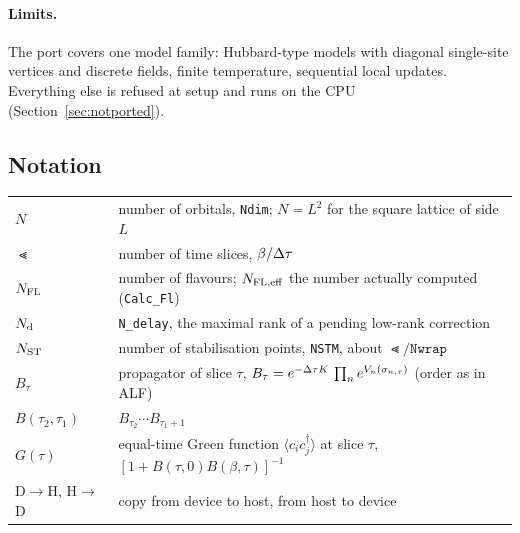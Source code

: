 \paragraph{Limits.} The port covers one model family: Hubbard-type models with diagonal single-site vertices and discrete fields, finite temperature, sequential local updates. Everything else is refused at setup and runs on the CPU (Section~\ref{sec:notported}).



\subsection{Notation}

\begin{tabular}{@{}lp{11.5cm}@{}}
$N$ & number of orbitals, \texttt{Ndim}; $N=L^2$ for the square lattice of side $L$\\
$\Lt$ & number of time slices, $\beta/\Delta\tau$\\
$N_{\rm FL}$ & number of flavours; $N_{\rm FL,eff}$ the number actually computed (\texttt{Calc\_Fl})\\
$N_{\rm d}$ & \texttt{N\_delay}, the maximal rank of a pending low-rank correction\\
$N_{\rm ST}$ & number of stabilisation points, \texttt{NSTM}, about $\Lt/\texttt{Nwrap}$\\
$B_\tau$ & propagator of slice $\tau$, $B_\tau = e^{-\Delta\tau K}\,\prod_n e^{V_n(\sigma_{n,\tau})}$ (order as in ALF)\\
$B(\tau_2,\tau_1)$ & $B_{\tau_2}\cdots B_{\tau_1+1}$\\
$G(\tau)$ & equal-time Green function $\langle c_i c_j^\dagger\rangle$ at slice $\tau$, $[1+B(\tau,0)B(\beta,\tau)]^{-1}$\\
D$\to$H, H$\to$D & copy from device to host, from host to device\\
\end{tabular}
